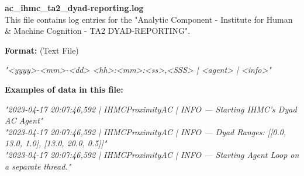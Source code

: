\begin{description}
\begin{addmargin}[0em]{0em}
    \label{ac_ihmc_ta2_dyad-reporting.log}
    \begin{addmargin}[1em]{0em} %
        \textbf{ac\_ihmc\_ta2\_dyad-reporting.log}\\
        This file contains log entries for the "Analytic Component - Institute for Human \& Machine Cognition - TA2 DYAD-REPORTING".
        \begin{addmargin}[1em]{0em}
            \textbf{Format:} (Text File)
            \begin{addmargin}[1em]{0em}
                \textit{"<yyyy>-<mm>-<dd> <hh>:<mm>:<ss>,<SSS> | <agent> | <info>"}
            \end{addmargin}
        \end{addmargin}
        \begin{addmargin}[1em]{0em}
            \textbf{Examples of data in this file:}
            \begin{addmargin}[1em]{0em}\textit{"2023-04-17 20:07:46,592 | IHMCProximityAC | INFO — Starting IHMC's Dyad AC Agent"\\
                "2023-04-17 20:07:46,592 | IHMCProximityAC | INFO — Dyad Ranges: [[0.0, 13.0, 1.0], [13.0, 20.0, 0.5]]"\\
                "2023-04-17 20:07:46,592 | IHMCProximityAC | INFO — Starting Agent Loop on a separate thread."}
            \end{addmargin}
        \end{addmargin}
    \end{addmargin} %
    \textbf{\\}


\end{addmargin}
\end{description}
